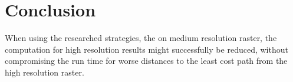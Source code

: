 \documentclass[acmtog]{acmart}
\begin{document}
	\section{Conclusion}\label{sec:conclusion}
	When using the researched strategies, the on medium resolution raster, the computation for high resolution results might successfully be reduced, without compromising the run time for worse distances to the least cost path from the high resolution raster.













\end{document}
